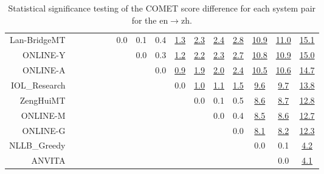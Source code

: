 \documentclass[11pt]{article}
\begin{document}
\begin{sidewaystable}
\begin{center}
{\begin{tabular}{rccccccccccccccc}
Lan-BridgeMT &  &  &  &  &  & \cellcolor{red!0} 0.0 & \cellcolor{red!0} 0.1 & \cellcolor{red!30} 0.4 & \cellcolor{red!70} \underline{1.3} & \cellcolor{red!70} \underline{2.3} & \cellcolor{red!70} \underline{2.4} & \cellcolor{red!70} \underline{2.8} & \cellcolor{red!70} \underline{10.9} & \cellcolor{red!70} \underline{11.0} & \cellcolor{red!70} \underline{15.1}\\ 
ONLINE-Y &  &  &  &  &  &  & \cellcolor{red!0} 0.0 & \cellcolor{red!30} 0.3 & \cellcolor{red!70} \underline{1.2} & \cellcolor{red!70} \underline{2.2} & \cellcolor{red!70} \underline{2.3} & \cellcolor{red!70} \underline{2.7} & \cellcolor{red!70} \underline{10.8} & \cellcolor{red!70} \underline{10.9} & \cellcolor{red!70} \underline{15.0}\\ 
ONLINE-A &  &  &  &  &  &  &  & \cellcolor{red!0} 0.0 & \cellcolor{red!70} \underline{0.9} & \cellcolor{red!70} \underline{1.9} & \cellcolor{red!70} \underline{2.0} & \cellcolor{red!70} \underline{2.4} & \cellcolor{red!70} \underline{10.5} & \cellcolor{red!70} \underline{10.6} & \cellcolor{red!70} \underline{14.7}\\ 
IOL\_Research &  &  &  &  &  &  &  &  & \cellcolor{red!0} 0.0 & \cellcolor{red!70} \underline{1.0} & \cellcolor{red!70} \underline{1.1} & \cellcolor{red!70} \underline{1.5} & \cellcolor{red!70} \underline{9.6} & \cellcolor{red!70} \underline{9.7} & \cellcolor{red!70} \underline{13.8}\\ 
ZengHuiMT &  &  &  &  &  &  &  &  &  & \cellcolor{red!0} 0.0 & \cellcolor{red!0} 0.1 & \cellcolor{red!60} 0.5 & \cellcolor{red!70} \underline{8.6} & \cellcolor{red!70} \underline{8.7} & \cellcolor{red!70} \underline{12.8}\\ 
ONLINE-M &  &  &  &  &  &  &  &  &  &  & \cellcolor{red!0} 0.0 & \cellcolor{red!20} 0.4 & \cellcolor{red!70} \underline{8.5} & \cellcolor{red!70} \underline{8.6} & \cellcolor{red!70} \underline{12.7}\\ 
ONLINE-G &  &  &  &  &  &  &  &  &  &  &  & \cellcolor{red!0} 0.0 & \cellcolor{red!70} \underline{8.1} & \cellcolor{red!70} \underline{8.2} & \cellcolor{red!70} \underline{12.3}\\ 
NLLB\_Greedy &  &  &  &  &  &  &  &  &  &  &  &  & \cellcolor{red!0} 0.0 & \cellcolor{red!0} 0.1 & \cellcolor{red!70} \underline{4.2}\\ 
ANVITA &  &  &  &  &  &  &  &  &  &  &  &  &  & \cellcolor{red!0} 0.0 & \cellcolor{red!70} \underline{4.1}\\ 
\bottomrule 
\end{tabular} }
\caption{Statistical significance testing of the COMET score difference for each system pair for the en$\rightarrow$zh.} 
 \end{center} \end{sidewaystable} 




\clearpage




\end{document}
